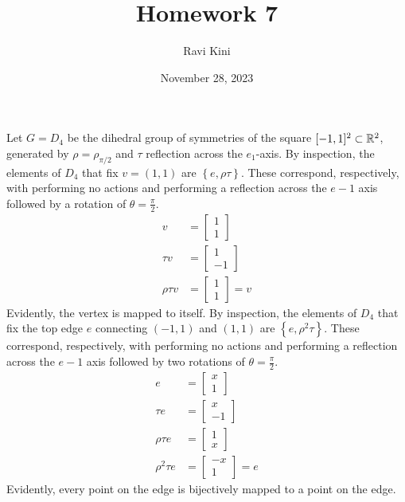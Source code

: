 \documentclass{article}
\title{Homework 7}
\author{Ravi Kini}
\date{November 28, 2023}
\begin{document}
\maketitle

Let $G = D_4$ be the dihedral group of symmetries of the square $[-1,1]^2 \subset \mathbb{R}^2$, generated by $\rho = \rho_{\pi/2}$ and $\tau$ reflection across the $e_1$-axis. By inspection, the elements of $D_4$ that fix $v = \left(1, 1\right)$ are $\left\{e, \rho\tau\right\}$. These correspond, respectively, with performing no actions and performing a reflection across the $e-1$ axis followed by a rotation of $\theta = \frac{\pi}{2}$.
\begin{equation}
    \begin{split}
        v & = \begin{bmatrix} 1 \\ 1 \end{bmatrix} \\
        \tau v & = \begin{bmatrix} 1 \\ -1 \end{bmatrix} \\
        \rho\tau v & = \begin{bmatrix} 1 \\ 1 \end{bmatrix} =  v
    \end{split}
\end{equation}
Evidently, the vertex is mapped to itself.
By inspection, the elements of $D_4$ that fix the top edge $e$ connecting $\left(-1, 1\right)$ and $\left(1, 1\right)$ are $\left\{e, \rho^2\tau\right\}$. These correspond, respectively, with performing no actions and performing a reflection across the $e-1$ axis followed by two rotations of $\theta = \frac{\pi}{2}$.
\begin{equation}
    \begin{split}
        e & = \begin{bmatrix} x \\ 1 \end{bmatrix} \\
        \tau e & = \begin{bmatrix} x \\ -1 \end{bmatrix} \\
        \rho\tau e & = \begin{bmatrix} 1 \\ x \end{bmatrix} \\
        \rho^2\tau e & = \begin{bmatrix} -x \\ 1 \end{bmatrix} =  e
    \end{split}
\end{equation}
Evidently, every point on the edge is bijectively mapped to a point on the edge.
\end{document}
